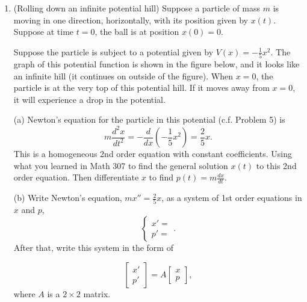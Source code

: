 \documentclass[11pt]{article}
\theoremstyle{definition}
\begin{document}
\begin{enumerate}[leftmargin=*]
\item (Rolling down an infinite potential hill)  Suppose a particle of mass $m$ is moving in one direction, horizontally,  with its position given by $x(t)$.   Suppose at time $t=0$, the ball is at position $x(0)=0$.

Suppose the particle is subject to a potential given by $V(x)=-\frac{1}{5}x^2$.  The graph of this potential function is shown in the figure below, and it looks like an infinite hill (it continues on outside of the figure).  When $x=0$, the particle is at the very top of this potential hill.  If it moves away from $x=0$, it will experience a drop in the potential.

\begin{center}
\end{center}

(a) Newton's equation for the particle in this potential (c.f. Problem 5) is  
\[
m\frac{d^2x}{dt^2}=-\frac{d}{dx}\left(-\frac{1}{5}x^2\right)=\frac{2}{5}x.
\]
This is a homogeneous 2nd order equation with constant coefficients.  Using what you learned in Math 307 to find the general solution $x(t)$ to this 2nd order equation. Then differentiate $x$ to find $p(t)=m\frac{dx}{dt}$.

(b) Write Newton's equation, $mx''=\frac{2}{5}x$,  
as a system of 1st order equations in $x$ and $p$,
\[
\begin{cases}
x'= \\
p'=
\end{cases}.
\]
After that, write this system in the form of 

\[
\left[\begin{array}{l} x'\\ p' \end{array}\right]=A  \left[\begin{array}{l} x\\ p\end{array}\right],
\]
where $A$ is a $2\times 2$ matrix.  



\end{enumerate}
\end{document}
